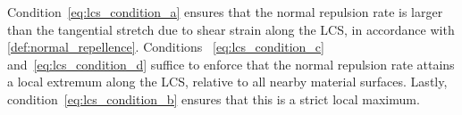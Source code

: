 Condition~\eqref{eq:lcs_condition_a} ensures that the normal repulsion rate is
larger than the tangential stretch due to shear strain along the LCS, in
accordance with \cref{def:normal_repellence}. Conditions%
~\eqref{eq:lcs_condition_c} and~\eqref{eq:lcs_condition_d} suffice to enforce
that the normal repulsion rate attains a local extremum along the LCS, relative
to all nearby material surfaces. Lastly, condition~\eqref{eq:lcs_condition_b}
ensures that this is a strict local maximum.
